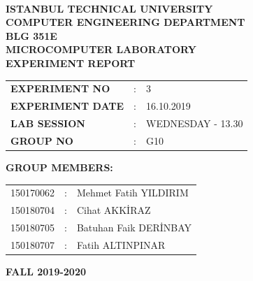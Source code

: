 \documentclass[pdftex,12pt,a4paper]{article}
\begin{document}
\begin{titlepage}
\begin{center}
\textbf{}\\
\textbf{\Large{ISTANBUL TECHNICAL UNIVERSITY}}\\
\vspace{0.5cm}
\textbf{\Large{COMPUTER ENGINEERING DEPARTMENT}}\\
\vspace{2cm}
\textbf{\Large{BLG 351E\\ MICROCOMPUTER LABORATORY\\ EXPERIMENT REPORT}}\\
\vspace{2.8cm}
\begin{table}[ht]
\centering
\Large{
\begin{tabular}{lcl}
\textbf{EXPERIMENT NO}  & : & 3 \\
\textbf{EXPERIMENT DATE}  & : & 16.10.2019 \\
\textbf{LAB SESSION}  & : & WEDNESDAY - 13.30 \\
\textbf{GROUP NO}  & : & G10 \\
\end{tabular}}
\end{table}
\vspace{1cm}
\textbf{\Large{GROUP MEMBERS:}}\\
\begin{table}[ht]
\centering
\Large{
\begin{tabular}{rcl}
150170062  & : & Mehmet Fatih YILDIRIM \\
150180704  & : & Cihat AKK\.{I}RAZ \\
150180705  & : & Batuhan Faik DER\.{I}NBAY \\
150180707  & : & Fatih ALTINPINAR \\
\end{tabular}}
\end{table}
\vspace{2.8cm}
\textbf{\Large{FALL 2019-2020}}

\end{center}

\end{titlepage}


\thispagestyle{empty}
\setcounter{tocdepth}{4}
\tableofcontents
\clearpage

\setcounter{page}{1}
\end{document}
